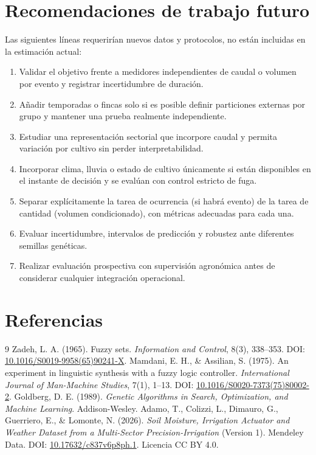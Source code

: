 \documentclass[11pt,letterpaper]{article}
\begin{document}
\section{Recomendaciones de trabajo futuro}
Las siguientes líneas requerirían nuevos datos y protocolos, no están incluidas en la estimación actual:
\begin{enumerate}
  \item Validar el objetivo frente a medidores independientes de caudal o volumen por evento y registrar incertidumbre de duración.
  \item Añadir temporadas o fincas solo si es posible definir particiones externas por grupo y mantener una prueba realmente independiente.
  \item Estudiar una representación sectorial que incorpore caudal y permita variación por cultivo sin perder interpretabilidad.
  \item Incorporar clima, lluvia o estado de cultivo únicamente si están disponibles en el instante de decisión y se evalúan con control estricto de fuga.
  \item Separar explícitamente la tarea de ocurrencia (si habrá evento) de la tarea de cantidad (volumen condicionado), con métricas adecuadas para cada una.
  \item Evaluar incertidumbre, intervalos de predicción y robustez ante diferentes semillas genéticas.
  \item Realizar evaluación prospectiva con supervisión agronómica antes de considerar cualquier integración operacional.
\end{enumerate}

\section*{Referencias}
\begin{thebibliography}{9}
 Zadeh, L. A. (1965). Fuzzy sets. \emph{Information and Control}, 8(3), 338--353. DOI: \href{https://doi.org/10.1016/S0019-9958(65)90241-X}{10.1016/S0019-9958(65)90241-X}.
 Mamdani, E. H., \& Assilian, S. (1975). An experiment in linguistic synthesis with a fuzzy logic controller. \emph{International Journal of Man-Machine Studies}, 7(1), 1--13. DOI: \href{https://doi.org/10.1016/S0020-7373(75)80002-2}{10.1016/S0020-7373(75)80002-2}.
 Goldberg, D. E. (1989). \emph{Genetic Algorithms in Search, Optimization, and Machine Learning}. Addison-Wesley.
 Adamo, T., Colizzi, L., Dimauro, G., Guerriero, E., \& Lomonte, N. (2026). \emph{Soil Moisture, Irrigation Actuator and Weather Dataset from a Multi-Sector Precision-Irrigation} (Version 1). Mendeley Data. DOI: \href{https://doi.org/10.17632/c837v6p8ph.1}{10.17632/c837v6p8ph.1}. Licencia CC BY 4.0.
\end{thebibliography}
\end{document}
